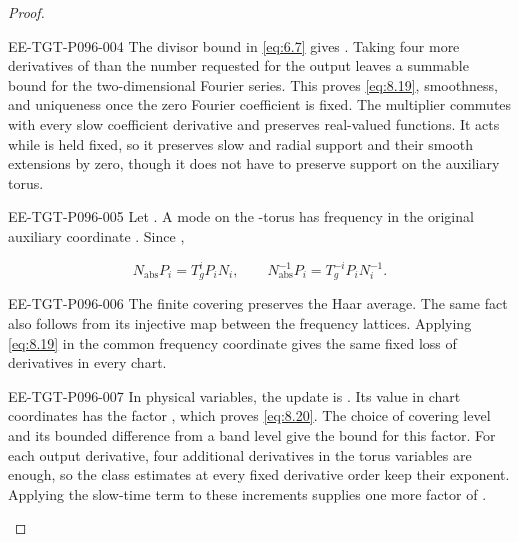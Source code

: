 \begin{proof}
\begin{EESegment}{EE-TGT-P096-004}
The divisor bound in \eqref{eq:6.7} gives
. Taking four more derivatives of
 than the number requested for the output leaves a summable
 bound for the two-dimensional Fourier series. This proves
\eqref{eq:8.19}, smoothness, and uniqueness once the zero Fourier coefficient is fixed. The
multiplier commutes with every slow coefficient derivative and preserves real-valued functions. It
acts while  is held fixed, so it preserves slow and radial support and
their smooth extensions by zero, though it does not have to preserve support on the auxiliary torus.
\end{EESegment}

\begin{EESegment}{EE-TGT-P096-005}
Let . A mode  on the
-torus has frequency  in the original
auxiliary coordinate . Since
,
\end{EESegment}
\begin{equation}
N_{\mathrm{abs}}P_i=T_g^iP_iN_i,
\qquad
N_{\mathrm{abs}}^{-1}P_i=T_g^{-i}P_iN_i^{-1}.
\tag{8.23}\label{eq:8.23}
\end{equation}
\begin{EESegment}{EE-TGT-P096-006}
The finite covering preserves the Haar average. The same fact also follows from its injective map
between the frequency lattices. Applying \eqref{eq:8.19} in the common frequency coordinate
 gives the same fixed loss of derivatives in every chart.
\end{EESegment}

\begin{EESegment}{EE-TGT-P096-007}
In physical variables, the update is
. Its value in chart coordinates
has the factor
, which proves
\eqref{eq:8.20}. The choice of covering level and its bounded difference from a band level give the
bound  for this factor. For each output derivative, four additional
derivatives in the torus variables are enough, so the class estimates at every fixed derivative order
keep their  exponent. Applying the slow-time term
 to these increments supplies one more factor of
.
\end{EESegment}


\end{proof}
